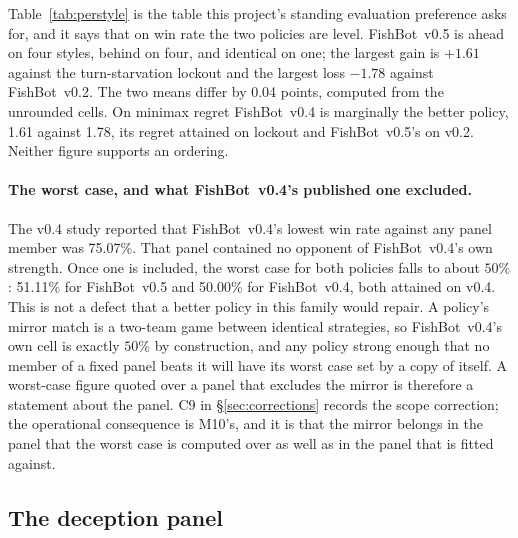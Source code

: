 \documentclass[11pt]{article}
\theoremstyle{definition}
\DeclareRobustCommand{\vfive}{\texorpdfstring{\mbox{FishBot v0.5}}{FishBot v0.5}}
\DeclareRobustCommand{\vfour}{\texorpdfstring{\mbox{FishBot v0.4}}{FishBot v0.4}}
\DeclareRobustCommand{\vtwo}{\texorpdfstring{\mbox{FishBot v0.2}}{FishBot v0.2}}
\providecommand{\numVfourVsVthree}{75.07}
\providecommand{\numDeltaVtwo}{-1.78}
\providecommand{\numDeltaLockout}{+1.61}
\providecommand{\numVfiveWorst}{51.11}
\providecommand{\numVfourWorst}{50.00}
\providecommand{\numVfiveRegret}{1.78}
\providecommand{\numVfourRegret}{1.61}
\providecommand{\numVfiveWorstOpp}{v0.4}
\providecommand{\numVfiveRegretOpp}{v0.2}
\providecommand{\numVfourRegretOpp}{lockout}
\providecommand{\numStyleMeanGap}{0.04}
\begin{document}
Table~\ref{tab:perstyle} is the table this project's standing evaluation
preference asks for, and it says that on win rate the two policies are level.
\vfive{} is ahead on four styles, behind on four, and identical on one; the
largest gain is $\numDeltaLockout$ against the turn-starvation lockout and the
largest loss $\numDeltaVtwo$ against \vtwo{}. The two means differ by
\numStyleMeanGap{} points, computed from the unrounded cells. On minimax regret \vfour{} is marginally the
better policy, \numVfourRegret{} against \numVfiveRegret{}, its regret attained on
\numVfourRegretOpp{} and \vfive{}'s on \numVfiveRegretOpp{}. Neither figure
supports an ordering.

\paragraph{The worst case, and what \vfour{}'s published one excluded.} The v0.4
study reported that \vfour{}'s lowest win rate against any panel member was
\numVfourVsVthree\%. That panel contained no opponent of \vfour{}'s own strength.
Once one is included, the worst case for both policies falls to about $50\%$:
\numVfiveWorst\% for \vfive{} and \numVfourWorst\% for \vfour{}, both attained on
\numVfiveWorstOpp{}. This is not a defect that a better policy in this family
would repair. A policy's mirror match is a two-team game between identical
strategies, so \vfour{}'s own cell is exactly $50\%$ by construction, and any
policy strong enough that no member of a fixed panel beats it will have its worst
case set by a copy of itself. A worst-case figure quoted over a panel that
excludes the mirror is therefore a statement about the panel. C9 in
\S\ref{sec:corrections} records the scope correction; the operational consequence
is M10's, and it is that the mirror belongs in the panel that the worst case is
computed over as well as in the panel that is fitted against.

\subsection{The deception panel}
\label{sec:results-deception}
\end{document}
